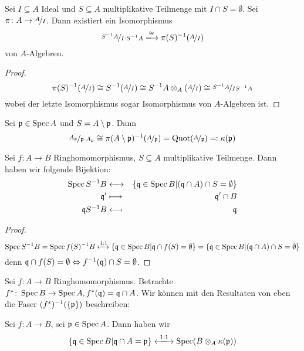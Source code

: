 \documentclass[12pt,a4paper]{scrartcl}
\theoremstyle{cplain}
\theoremstyle{cdef}
\begin{document}
\begin{kor}
	Sei $I\subseteq A$ Ideal und $S\subseteq A$ multiplikative Teilmenge mit $I\cap S = \emptyset$. Sei $\pi\colon A \to \nicefrac{A}{I}$. Dann existiert ein Isomorphismus
	$$\fak{S^{-1}A}{I\cdot S^{-1}A} \xlongrightarrow{\cong} \pi(S)^{-1}(\fak{A}{I})$$
	von $A$-Algebren.
\end{kor}
\begin{proof}
	$$\pi(S)^{-1}(\nicefrac{A}{I}) \cong S^{-1}(\nicefrac{A}{I}) \cong S^{-1}A\otimes_A(\nicefrac{A}{I}) \cong \nicefrac{S^{-1}A}{IS^{-1}A}$$
	wobei der letzte Isomorphismus sogar Isomorphismus von $A$-Algebren ist.
\end{proof}
\begin{kor}
	Sei $\mathfrak{p}\in \operatorname{Spec} A$ und $S = A\setminus \mathfrak{p}$. Dann
	$$\nicefrac{A_{\mathfrak{p}}}{\mathfrak{p}\cdot A_{\mathfrak{p}}}\cong \pi(A\setminus \mathfrak{p})^{-1}(\nicefrac{A}{\mathfrak{p}}) = \operatorname{Quot}(\nicefrac{A}{\mathfrak{p}}) \eqqcolon \kappa(\mathfrak{p})$$
	
\end{kor}
\begin{kor}
Sei $f\colon A\to B$ Ringhomomorphismus, $S\subseteq A$ multiplikative Teilmenge. Dann haben wir folgende Bijektion:
\begin{eqnarray*}
	\operatorname{Spec} S^{-1}B & \longleftrightarrow & \{\mathfrak{q} \in \operatorname{Spec} B| (\mathfrak{q} \cap A)\cap S = \emptyset\}\\
	\mathfrak{q}' & \longmapsto & \mathfrak{q}'\cap B\\
	\mathfrak{q} S^{-1}B & \longmapsfrom & \mathfrak{q}
\end{eqnarray*}
\end{kor}
\begin{proof}
	$$\operatorname{Spec} S^{-1}B = \operatorname{Spec} f(S)^{-1}B \xleftrightarrow{1:1} \{\mathfrak{q} \in \operatorname{Spec} B|\mathfrak{q}\cap f(S) = \emptyset\}
	 = \{\mathfrak{q} \in \operatorname{Spec} B|(\mathfrak{q} \cap A)\cap S = \emptyset\}$$
	 denn $\mathfrak{q}\cap f(S) = \emptyset \Leftrightarrow f^{-1}(\mathfrak{q})\cap S = \emptyset$.
\end{proof}
Sei $f\colon A \to B$ Ringhomomorphismus. Betrachte $f^{*}\colon \operatorname{Spec} B \to \operatorname{Spec} A, f^{*}(\mathfrak{q}) = \mathfrak{q}\cap A$. Wir können mit den Resultaten von eben die Faser $(f^{*})^{-1}(\{\mathfrak{p}\})$ beschreiben:
\begin{kor}
	Sei $f\colon A \to B$, sei $\mathfrak{p}\in \operatorname{Spec} A$. Dann haben wir
	$$\{\fq\in \Spec B|\fq\cap A = \fp\}\xlongleftrightarrow{1:1}\Spec(B\otimes_A\kappa(\fp))$$
\end{kor}
\end{document}

